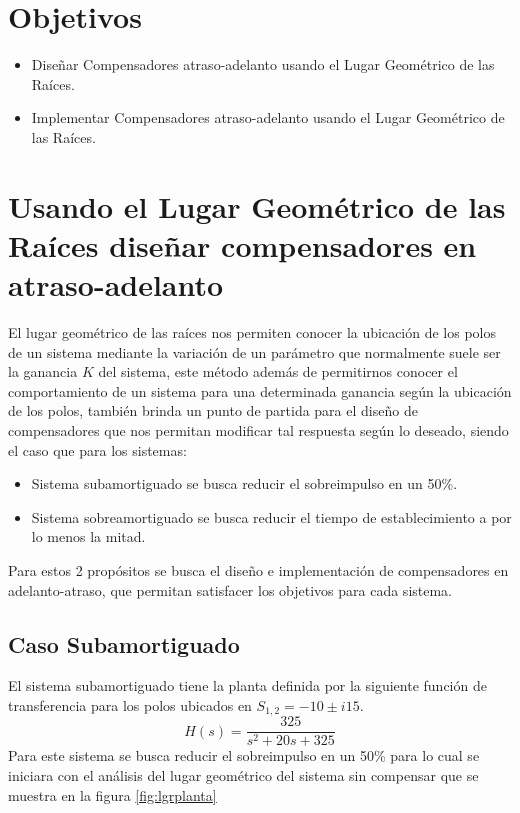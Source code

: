 \documentclass[conference]{IEEEtran}
\begin{document}
	\section{Objetivos}
	
	\begin{itemize}
		\item Diseñar Compensadores atraso-adelanto usando el Lugar Geométrico de las Raíces.
		\item Implementar Compensadores atraso-adelanto usando el Lugar Geométrico de las Raíces.
	\end{itemize}
	
	\section{Usando el Lugar Geométrico de las Raíces diseñar compensadores en atraso-adelanto}
	
	El lugar geométrico de las raíces nos permiten conocer la ubicación de los polos de un sistema mediante la variación de un parámetro que normalmente suele ser la ganancia $K$ del sistema, este método además de permitirnos conocer el comportamiento de un sistema para una determinada ganancia según la ubicación de los polos, también brinda un punto de partida para el diseño de compensadores que nos permitan modificar tal respuesta según lo deseado, siendo el caso que para los sistemas:
	
	\begin{itemize}
		\item Sistema subamortiguado se busca reducir el sobreimpulso en un 50\%.
		\item Sistema sobreamortiguado se busca reducir el tiempo de establecimiento a por lo menos la mitad.
	\end{itemize}
	
	Para estos 2 propósitos se busca el diseño e implementación de compensadores en adelanto-atraso, que permitan satisfacer los objetivos para cada sistema.
	
	\subsection{\textbf{Caso Subamortiguado}}
	El sistema subamortiguado tiene la planta definida por la siguiente función de transferencia para los polos ubicados en $S_{1,2} = -10 \pm i15$.
	\begin{equation}
		H(s) = \frac{325}{s^2 + 20s + 325}
		\label{eq:ft-planta}
	\end{equation}
	Para este sistema se busca reducir el sobreimpulso en un 50\% para lo cual se iniciara con el análisis del lugar geométrico del sistema sin compensar que se muestra en la figura \ref{fig:lgrplanta}
	
\end{document}
